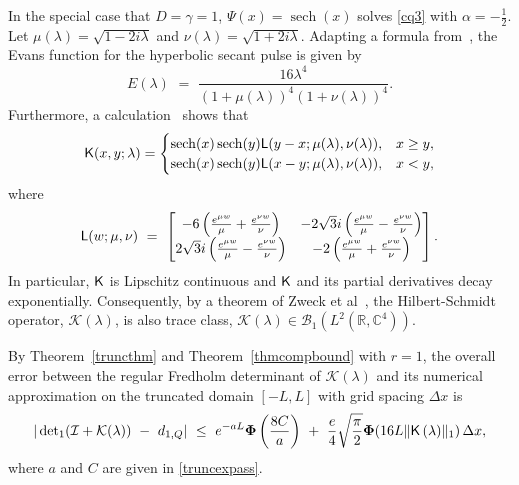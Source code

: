\documentclass{birkjour}
\theoremstyle{definition}
\theoremstyle{remark}
\numberwithin{equation}{section}
\begin{document}
In the special case that 
$D=\gamma=1$,  $ \Psi(x) = \operatorname{sech}(x)$ solves \eqref{cq3} with
$\alpha = -\frac 12$. Let $\mu(\lambda) = \sqrt{1 - 2i \lambda}$ and $\nu(\lambda) = \sqrt{1 + 2i \lambda}$.
Adapting a formula from~\cite{Kap},  the Evans function for the hyperbolic secant pulse
is given by~\cite{Gallo}
\begin{equation}\label{eq:Evans}
E(\lambda) \,\,=\,\, \frac{16 \lambda^4}{ ( 1 + \mu(\lambda))^4 ( 1 + \nu(\lambda))^4}.
\end{equation}
Furthermore, a calculation~\cite{Gallo} shows that 
\begin{equation}
   \textsf{K}(x,y;\lambda) = 
   \begin{cases} 
    \operatorname{sech}(x) \operatorname{sech}(y) \textsf L(y-x;\mu(\lambda),\nu(\lambda)), & x \geq y,\\
    \operatorname{sech}(x) \operatorname{sech}(y) \textsf L(x-y;\mu(\lambda),\nu(\lambda)), & x < y,    
    \end{cases}
\end{equation}
where
\begin{equation}
 \textsf L(w;\mu,\nu) \,\,=\,\, 
 \begin{bmatrix} -6 \left( \frac{e^{\mu w}}{\mu} + \frac{ e^{\nu w}}{\nu}\right) & -2\sqrt{3}i \left( \frac{e^{\mu w}}{\mu} - \frac{e^{\nu w}}{\nu} \right)\\
        2 \sqrt{3}i \left( \frac{e^{\mu w}}{\mu} - \frac{e^{\nu w}}{\nu} \right) & 
        -2 \left( \frac{e^{\mu w}}{\mu} + \frac{e^{\nu w}}{\nu} \right)
    \end{bmatrix}.
\end{equation}
In particular, $\textsf K$ is Lipschitz continuous and $\textsf K$ and its partial derivatives
 decay exponentially. Consequently, by a theorem of Zweck et al~\cite{zweck2024regularity},
the Hilbert-Schmidt operator, $\mathcal K(\lambda)$, is also trace class, 
 $\mathcal K(\lambda)\in {\mathcal B}_1(L^2(\mathbb R, \mathbb C^4))$. 

By Theorem~\ref{truncthm} and Theorem~\ref{thmcompbound} with $r=1$, 
the overall error between
the regular Fredholm determinant of $\mathcal K(\lambda)$ and its numerical
approximation on the truncated domain $[-L,L]$ with grid spacing $\Delta x$ is 
\begin{equation}
| \operatorname{det}_1(\mathcal I + \mathcal K(\lambda)) \,\,-\,\, d_{1,Q} |
\,\,\leq\,\, e^{-aL} \boldsymbol\Phi\left(\frac{8C}a\right) \,\,+\,\, \frac{e}4 \sqrt{\frac{\pi}2}
\boldsymbol\Phi(16L \| \textsf K\left(\lambda)\|_{1}\right)\Delta x,
\end{equation}
where $a$ and $C$ are given in \eqref{truncexpass}. 
\end{document}
